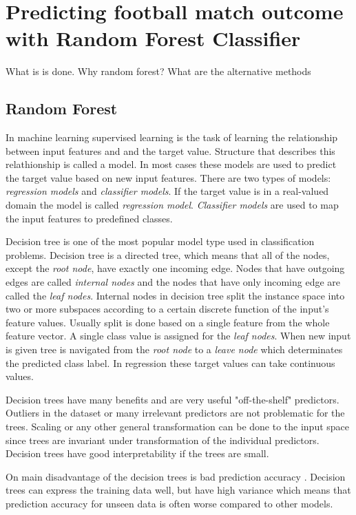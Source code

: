 \section{Predicting football match outcome with Random Forest Classifier}
What is is done. Why random forest? What are the alternative methods
\subsection{Random Forest}
\label{ss:randomforest}
In machine learning supervised learning is the task of learning the relationship between input features and and the target value. Structure that describes this relathionship is called a model. In most cases these models are used to predict the target value based on new input features. There are two types of models: \textit{regression models} and \textit{classifier models}. If the target value is in a real-valued domain the model is called \textit{regression model}. \textit{Classifier models} are used to map the input features to predefined classes. \cite{rokach2005top}

Decision tree is one of the most popular model type used in classification problems. Decision tree is a directed tree, which means that all of the nodes, except the \textit{root node}, have exactly one incoming edge. Nodes that have outgoing edges are called \textit{internal nodes} and the nodes that have only incoming edge are called the \textit{leaf nodes}. Internal nodes in decision tree split the instance space into two or more subspaces according to a certain discrete function of the input's feature values. Usually split is done based on a single feature from the whole feature vector. A single class value is assigned for the \textit{leaf nodes}. When new input is given tree is navigated from the \textit{root node} to a \textit{leave node} which determinates the predicted class label. In regression these target values can take continuous values. \cite{rokach2005top}

Decision trees have many benefits and are very useful "off-the-shelf" predictors. Outliers in the dataset or many irrelevant predictors are not problematic for the trees. Scaling or any other general transformation can be done to the input space since trees are invariant under transformation of the individual predictors. \cite{friedman2001elements} Decision trees have good interpretability if the trees are small.

On main disadvantage of the decision trees is bad prediction accuracy \cite{friedman2001elements}. Decision trees can express the training data well, but have high variance which means that prediction accuracy for unseen data is often worse compared to other models.

